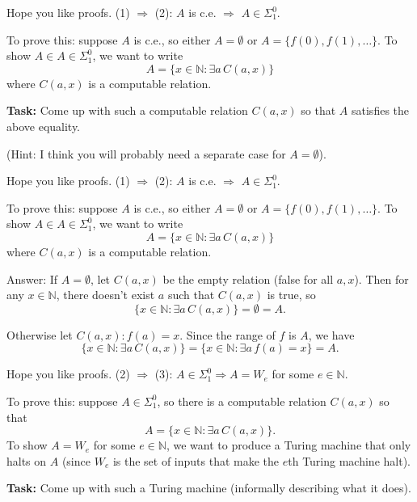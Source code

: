\documentclass{beamer}
\begin{document}
\begin{frame}{Hope you like proofs.}
(1) $\Rightarrow$ (2): $A$ is c.e. $\Rightarrow$ $A \in \Sigma^0_1$.

\vspace{2mm}

To prove this: suppose $A$ is c.e., so either $A = \emptyset$ or $A = \{f(0), f(1), \ldots\}$. To show $A \in A \in \Sigma^0_1$, we want to write
$$A = \{x \in \mathbb N: \exists a \, C(a, x)\}$$
where $C(a, x)$ is a computable relation.

\vspace{2mm}

\textbf{Task:} Come up with such a computable relation $C(a, x)$ so that $A$ satisfies the above equality. 

\vspace{2mm}

(Hint: I think you will probably need a separate case for $A = \emptyset$).
\end{frame}

\begin{frame}{Hope you like proofs.}
(1) $\Rightarrow$ (2): $A$ is c.e. $\Rightarrow$ $A \in \Sigma^0_1$.

\vspace{2mm}

To prove this: suppose $A$ is c.e., so either $A = \emptyset$ or $A = \{f(0), f(1), \ldots\}$. To show $A \in A \in \Sigma^0_1$, we want to write
$$A = \{x \in \mathbb N: \exists a \, C(a, x)\}$$
where $C(a, x)$ is a computable relation.

\vspace{2mm}

Answer: If $A = \emptyset$, let $C(a, x)$ be the empty relation (false for all $a, x$). Then for any $x \in \mathbb N$, there doesn't exist $a$ such that $C(a, x)$ is true, so
$$\{x \in \mathbb N: \exists a \, C(a, x)\} = \emptyset = A.$$

Otherwise let $C(a, x): f(a) = x$. Since the range of $f$ is $A$, we have
$$\{x \in \mathbb N: \exists a \, C(a, x)\} = \{x \in \mathbb N: \exists a \, f(a) = x\} = A.$$
\end{frame}

\begin{frame}{Hope you like proofs.}
(2) $\Rightarrow$ (3): $A \in \Sigma^0_1 \Rightarrow A = W_e$ for some $e \in \mathbb N$.

\vspace{2mm}

To prove this: suppose $A \in \Sigma^0_1$, so there is a computable relation $C(a, x)$ so that
$$A = \{x \in \mathbb N: \exists a \, C(a, x)\}.$$
To show $A = W_e$ for some $e \in \mathbb N$, we want to produce a Turing machine that only halts on $A$ (since $W_e$ is the set of inputs that make the $e$th Turing machine halt).

\vspace{2mm}

\textbf{Task:} Come up with such a Turing machine (informally describing what it does).
\end{frame}
\end{document}
